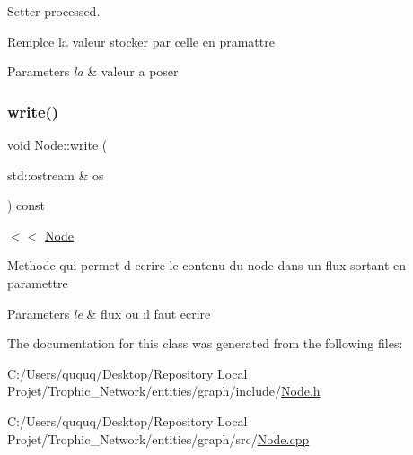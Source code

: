 Setter processed. 

Remplce la valeur stocker par celle en pramattre


\begin{DoxyParams}{Parameters}
{\em la} & valeur a poser \\
\hline
\end{DoxyParams}
\mbox{\label{class_node_a01967a39cb1b94b4132715443bf31b69}} 
\subsubsection{\texorpdfstring{write()}{write()}}
{\footnotesize\ttfamily void Node\+::write (\begin{DoxyParamCaption}\item[{std\+::ostream \&}]{os }\end{DoxyParamCaption}) const}



$<$$<$ \mbox{\hyperlink{class_node}{Node}} 

Methode qui permet d ecrire le contenu du node dans un flux sortant en paramettre


\begin{DoxyParams}{Parameters}
{\em le} & flux ou il faut ecrire \\
\hline
\end{DoxyParams}


The documentation for this class was generated from the following files\+:\begin{DoxyCompactItemize}
\item 
C\+:/\+Users/ququq/\+Desktop/\+Repository Local Projet/\+Trophic\+\_\+\+Network/entities/graph/include/\mbox{\hyperlink{_node_8h}{Node.\+h}}\item 
C\+:/\+Users/ququq/\+Desktop/\+Repository Local Projet/\+Trophic\+\_\+\+Network/entities/graph/src/\mbox{\hyperlink{_node_8cpp}{Node.\+cpp}}\end{DoxyCompactItemize}
